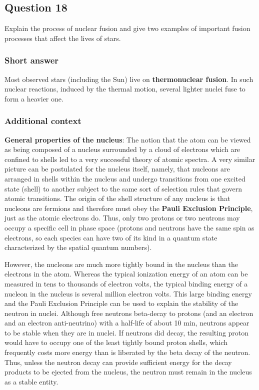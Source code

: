 \documentclass[a4paper,10pt]{article}
\begin{document}

\newpage
\subsection{Question 18}

Explain the process of nuclear fusion and give two examples of important fusion processes that affect the lives of stars.

\subsubsection{Short answer}

Most observed stars (including the Sun) live on \textbf{thermonuclear fusion}. In such nuclear reactions, induced by the thermal motion, several lighter nuclei fuse to form a heavier one.

\subsubsection{Additional context}

\textbf{General properties of the nucleus}: The notion that the atom can be viewed as being composed of a nucleus surrounded by a cloud of electrons which are confined to shells led to a very successful theory of atomic spectra. A very similar picture can be postulated for the nucleus itself, namely, that nucleons are arranged in shells within the nucleus and undergo transitions from one excited state (shell) to another subject to the same sort of selection rules that govern atomic transitions. The origin of the shell structure of any nucleus is that nucleons are fermions and therefore must obey the \textbf{Pauli Exclusion Principle}, just as the atomic electrons do. Thus, only two protons or two neutrons may occupy a specific cell in phase space (protons and neutrons have the same spin as electrons, so each species can have two of its kind in a quantum state characterized by the spatial quantum numbers).

{\noindent}However, the nucleons are much more tightly bound in the nucleus than the electrons in the atom. Whereas the typical ionization energy of an atom can be measured in tens to thousands of electron volts, the typical binding energy of a nucleon in the nucleus is several million electron volts. This large binding energy and the Pauli Exclusion Principle can be used to explain the stability of the neutron in nuclei. Although free neutrons beta-decay to protons (and an electron and an electron anti-neutrino) with a half-life of about 10 min, neutrons appear to be stable when they are in nuclei. If neutrons did decay, the resulting proton would have to occupy one of the least tightly bound proton shells, which frequently costs more energy than is liberated by the beta decay of the neutron. Thus, unless the neutron decay can provide sufficient energy for the decay products to be ejected from the nucleus, the neutron must remain in the nucleus as a stable entity.
\end{document}
